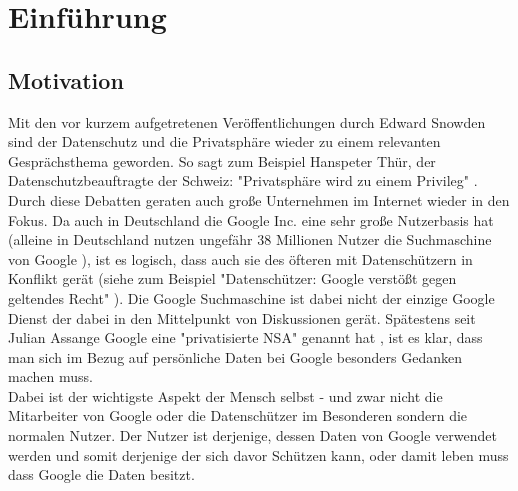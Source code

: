 %
% 

\chapter{Einführung}


\section{Motivation}
Mit den vor kurzem aufgetretenen Veröffentlichungen durch Edward Snowden sind der Datenschutz und die Privatsphäre wieder zu einem relevanten Gesprächsthema geworden. So sagt zum Beispiel Hanspeter Thür, der Datenschutzbeauftragte der Schweiz: "Privatsphäre wird zu einem Privileg" \cite{nzzdatenschutzprivileg}. Durch diese Debatten geraten auch große Unternehmen im Internet wieder in den Fokus. Da auch in Deutschland die Google Inc. eine sehr große Nutzerbasis hat (alleine in Deutschland nutzen ungefähr 38 Millionen Nutzer die Suchmaschine von Google \cite{statistagoogle}), ist es logisch, dass auch sie des öfteren mit Datenschützern in Konflikt gerät (siehe zum Beispiel "Datenschützer: Google verstößt gegen geltendes Recht" \cite{gulligooglegeltendesrecht}). Die Google Suchmaschine ist dabei nicht der einzige Google Dienst der dabei in den Mittelpunkt von Diskussionen gerät. Spätestens seit Julian Assange Google eine "privatisierte NSA" genannt hat \cite{assangegooglensa}, ist es klar, dass man sich im Bezug auf persönliche Daten bei Google besonders Gedanken machen muss.\\
Dabei ist der wichtigste Aspekt der Mensch selbst - und zwar nicht die Mitarbeiter von Google oder die Datenschützer im Besonderen sondern die normalen Nutzer. Der Nutzer ist derjenige, dessen Daten von Google verwendet werden und somit derjenige der sich davor Schützen kann, oder damit leben muss dass Google die Daten besitzt.


